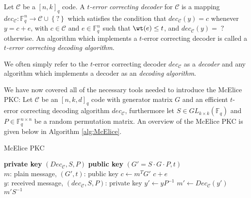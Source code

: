 \begin{definition}\label{def:decoder}
Let $\mathcal{C}$ be a $[n, k]_{q}$ code. A \textit{$t$-error correcting decoder} for $\mathcal{C}$ is a mapping $dec_{\mathcal{C}}: \mathbb{F}_q^n \to \mathcal{C} \cup \left\{?\right\}$ which satisfies the condition that $dec_{\mathcal{C}}(y) = c$ whenever $y = c + e$, with $c \in \mathcal{C}$ and $e \in \mathbb{F}_q^n$ such that $\wt(e) \leq t$, and $dec_{\mathcal{C}}(y) = \; ?$ otherwise. An algorithm which implements a $t$-error correcting decoder is called a \textit{$t$-error correcting decoding algorithm}.
\end{definition}
\begin{remark}
  We often simply refer to the $t$-error correcting decoder $dec_{\mathcal{C}}$ as a \textit{decoder} and any algorithm which implements a decoder as an \textit{decoding algorithm}.
\end{remark}


We have now covered all of the necessary tools needed to introduce the McElice PKC:
Let $\mathcal{C}$ be an $[n, k, d]_q$ code with generator matrix $G$ and an efficient $t$-error correcting decoding algorithm $dec_{\mathcal{C}}$, furthermore let $S \in GL_{k \times k}(\mathbb{F}_q)$ and $P \in \mathbb{F}_q^{n \times n}$ be a random permutation matrix. An overview of the McElice PKC is given below in Algorithm \ref{alg:McElice}.
\begin{algorithm}
\caption{McElice PKC}\label{alg:McElice}
\begin{algorithmic}
  \State \textbf{private key} $(Dec_{\mathcal{C}}, S, P)$
  \State \textbf{public key} $(G' = S \cdot G \cdot P, t)$
  \\
   {$m$: plain message, $(G', t)$: public key}
    \State $c \gets m^{T} G'$
    \State \Return $c + e$ 
  \EndProcedure \\
   {$y$: received message, $(dec_{\mathcal{C}}, S, P)$: private key}
    \State $y' \gets y P^{-1}$
    \State $m' \gets Dec_{\mathcal{C}}(y')$
    \State \Return $m' S^{-1}$
  \EndProcedure
\end{algorithmic}
\end{algorithm}

